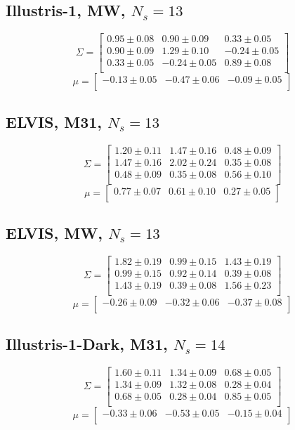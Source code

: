 \documentclass[a4paper,fleqn,usenatbib]{mnras}
\begin{document}
\subsection{Illustris-1, MW, $N_s=13$}
\[
\Sigma=
\begin{bmatrix}
0.95 \pm 0.08 & 0.90 \pm 0.09 & 0.33 \pm 0.05\\
0.90 \pm 0.09 & 1.29 \pm 0.10 & -0.24 \pm 0.05\\
0.33 \pm 0.05 & -0.24 \pm 0.05 & 0.89 \pm 0.08\\
\end{bmatrix}
\]
\[
\mu=
\begin{bmatrix}
-0.13 \pm 0.05 & -0.47 \pm 0.06 & -0.09 \pm 0.05\\
\end{bmatrix}
\]

\subsection{ELVIS, M31, $N_s=13$}
\[
\Sigma=
\begin{bmatrix}
1.20 \pm 0.11 & 1.47 \pm 0.16 & 0.48 \pm 0.09\\
1.47 \pm 0.16 & 2.02 \pm 0.24 & 0.35 \pm 0.08\\
0.48 \pm 0.09 & 0.35 \pm 0.08 & 0.56 \pm 0.10\\
\end{bmatrix}
\]
\[
\mu=
\begin{bmatrix}
0.77 \pm 0.07 & 0.61 \pm 0.10 & 0.27 \pm 0.05\\
\end{bmatrix}
\]
\subsection{ELVIS, MW, $N_s=13$}
\[
\Sigma=
\begin{bmatrix}
1.82 \pm 0.19 & 0.99 \pm 0.15 & 1.43 \pm 0.19\\
0.99 \pm 0.15 & 0.92 \pm 0.14 & 0.39 \pm 0.08\\
1.43 \pm 0.19 & 0.39 \pm 0.08 & 1.56 \pm 0.23\\
\end{bmatrix}
\]
\[
\mu=
\begin{bmatrix}
-0.26 \pm 0.09 & -0.32 \pm 0.06 & -0.37 \pm 0.08\\
\end{bmatrix}
\]

\subsection{Illustris-1-Dark, M31, $N_s=14$}
\[
\Sigma=
\begin{bmatrix}
1.60 \pm 0.11 & 1.34 \pm 0.09 & 0.68 \pm 0.05\\
1.34 \pm 0.09 & 1.32 \pm 0.08 & 0.28 \pm 0.04\\
0.68 \pm 0.05 & 0.28 \pm 0.04 & 0.85 \pm 0.05\\
\end{bmatrix}
\]
\[
\mu=
\begin{bmatrix}
-0.33 \pm 0.06 & -0.53 \pm 0.05 & -0.15 \pm 0.04\\
\end{bmatrix}
\]
\end{document}
